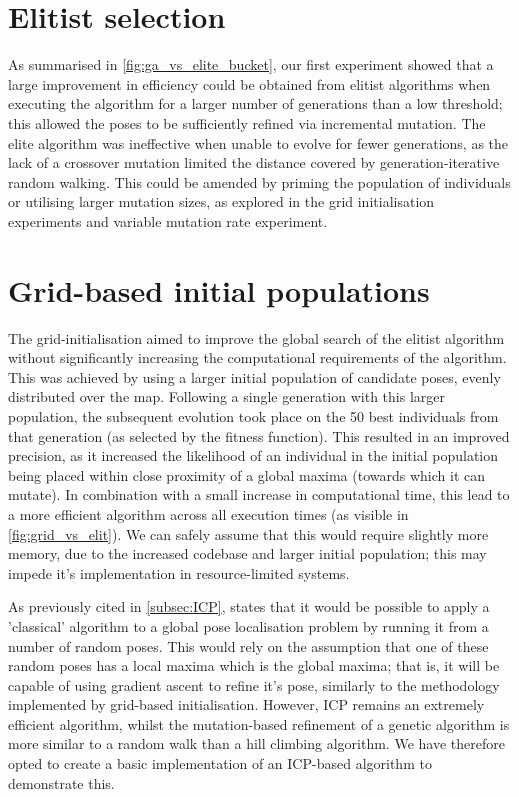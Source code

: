 \documentclass[authoryearcitations]{UoYCSproject}
\begin{document}
\section{Elitist selection}
As summarised in \autoref{fig:ga_vs_elite_bucket}, our first experiment showed that a large improvement in efficiency could be obtained from elitist algorithms when executing the algorithm for a larger number of generations than a low threshold; this allowed the poses to be sufficiently refined via incremental mutation. The elite algorithm was ineffective when unable to evolve for fewer generations, as the lack of a crossover mutation limited the distance covered by generation-iterative random walking. This could be amended by priming the population of individuals or utilising larger mutation sizes, as explored in the grid initialisation experiments and variable mutation rate experiment.

\section{Grid-based initial populations}
The grid-initialisation aimed to improve the global search of the elitist algorithm without significantly increasing the computational requirements of the algorithm. This was achieved by using a larger initial population of candidate poses, evenly distributed over the map. Following a single generation with this larger population, the subsequent evolution took place on the 50 best individuals from that generation (as selected by the fitness function). This resulted in an improved precision, as it increased the likelihood of an individual in the initial population being placed within close proximity of a global maxima (towards which it can mutate). In combination with a small increase in computational time, this lead to a more efficient algorithm across all execution times (as visible in \autoref{fig:grid_vs_elit}). We can safely assume that this would require slightly more memory, due to the increased codebase and larger initial population; this may impede it's implementation in resource-limited systems. 

As previously cited in \autoref{subsec:ICP}, \citet{Censi2005-iv} states that it would be possible to apply a 'classical' algorithm to a global pose localisation problem by running it from a number of random poses. This would rely on the assumption that one of these random poses has a local maxima which is the global maxima; that is, it will be capable of using gradient ascent to refine it's pose, similarly to the methodology implemented by grid-based initialisation. However, ICP remains an extremely efficient algorithm, whilst the mutation-based refinement of a genetic algorithm is more similar to a random walk than a hill climbing algorithm. We have therefore opted to create a basic implementation of an ICP-based algorithm to demonstrate this.
\end{document}
